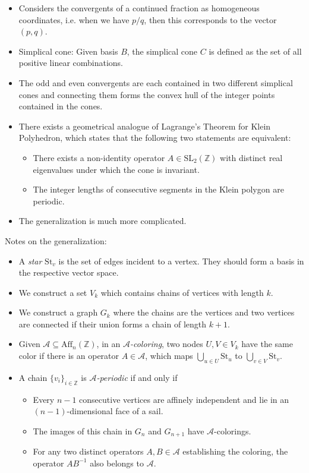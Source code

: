 \begin{itemize}
  \item Considers the convergents of a continued fraction as homogeneous coordinates,
    i.e. when we have $p / q$, then this corresponds to the vector $(p, q)$.
  \item Simplical cone: Given basis $B$, the simplical cone $C$ is defined as
    the set of all positive linear combinations.
  \item
    The odd and even convergents are each contained in two different simplical cones
    and connecting them forms the convex hull of the integer points contained in the cones.
  \item
    There exists a geometrical analogue of Lagrange's Theorem for Klein Polyhedron,
    which states that the following two statements are equivalent:
    \begin{itemize}
      \item
        There exists a non-identity operator $A ∈ \mathrm{SL}_2(ℤ)$ with
        distinct real eigenvalues under which the cone is invariant.
      \item
        The integer lengths of consecutive segments in the Klein polygon are periodic.
    \end{itemize}
  \item The generalization is much more complicated.
\end{itemize}

Notes on the generalization:
\begin{itemize}
  \item
    A \emph{star} $\mathrm{St}_v$ is the set of edges incident to a vertex.
    They should form a basis in the respective vector space.
  \item
    We construct a set $V_k$ which contains chains of vertices with length $k$.
  \item
    We construct a graph $G_k$ where the chains are the vertices and two
    vertices are connected if their union forms a chain of length $k + 1$.
  \item
    Given $\mathcal A ⊆ \mathrm{Aff}_n(ℤ)$,
    in an \emph{$\mathcal A$-coloring},
    two nodes $U, V ∈ V_k$ have the same color if there is an operator $A ∈ \mathcal A$,
    which maps $\bigcup_{u ∈ U} \mathrm{St}_u$ to $\bigcup_{v ∈ V} \mathrm{St}_v$.
  \item
    A chain $\{v_i\}_{i ∈ ℤ}$ is \emph{$\mathcal A$-periodic} if and only if
    \begin{itemize}
      \item Every $n-1$ consecutive vertices are affinely independent
        and lie in an $(n-1)$-dimensional face of a sail.
      \item
        The images of this chain in $G_n$ and $G_{n+1}$ have $\mathcal A$-colorings.
      \item
        For any two distinct operators $A, B ∈ \mathcal A$ establishing the
        coloring, the operator $AB^{-1}$ also belongs to $\mathcal A$.
    \end{itemize}
\end{itemize}
